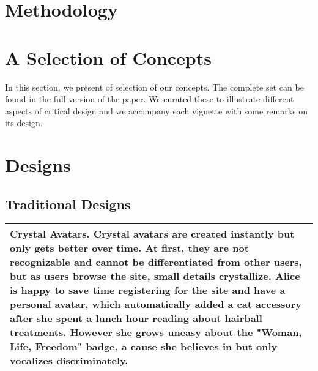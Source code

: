 \section{Methodology}


\section{A Selection of Concepts}

In this section, we present of selection of our concepts. The complete set can be found in the full version of the paper. We curated these to illustrate different aspects of critical design and we accompany each vignette with some remarks on its design.




\section{Designs}
\subsection{Traditional Designs}


\begin{tabular}{|p{}|}
\hline
\textbf{Crystal Avatars.} Crystal avatars are created instantly but only gets better over time. At first, they are not recognizable and cannot be differentiated from other users, but as users browse the site, small details crystallize. Alice is happy to save time registering for the site and have a personal avatar, which automatically added a cat accessory after she spent a lunch hour reading about hairball treatments. However she grows uneasy about the "Woman, Life, Freedom" badge, a cause she believes in but only vocalizes discriminately.  \\ \hline
\end{tabular}

